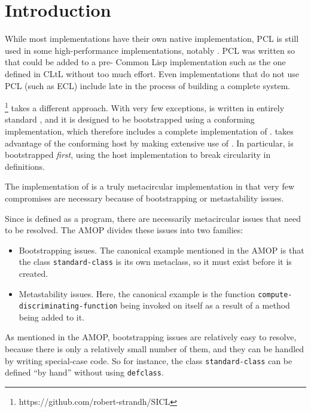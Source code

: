 \section{Introduction}

While most \cl{} implementations have their own native \clos{}
implementation, PCL \cite{Bobrow:1986:CML:28697.28700} is still used
in some high-performance implementations, notably \sbcl{}.  PCL was
written so that \clos{} could be added to a pre-\clos{} Common Lisp
implementation such as the one defined in CLtL \cite{Steele:1984:CLL}
without too much effort.  Even \cl{} implementations that do not use
PCL (such as ECL) include \clos{} late in the process of building a
complete system.

\sicl{}\footnote{https://github.com/robert-strandh/SICL} takes a
different approach.  With very few exceptions, \sicl{} is written in
entirely standard \cl{}, and it is designed to be bootstrapped using a
conforming \cl{} implementation, which therefore includes a complete
implementation of \clos{}.  \sicl{} takes advantage of the conforming
host by making extensive use of \clos{}.  In particular, \clos{} is
bootstrapped \emph{first}, using the host \clos{} implementation to
break circularity in definitions. 

The \sicl{} implementation of \clos{} is a truly metacircular
implementation in that very few compromises are necessary because of
bootstrapping or metastability issues.

Since \clos{} is defined as a \clos{} program, there are necessarily
metacircular issues that need to be resolved.  The AMOP
\cite{Kiczales:1991:AMP:574212} divides these issues into two
families:

\begin{itemize}
\item Bootstrapping issues.  The canonical example mentioned in the
  AMOP is that the class \texttt{standard-class} is its own metaclass,
  so it must exist before it is created.  
\item Metastability issues.  Here, the canonical example is the
  function \texttt{compute-discriminating-function} being invoked on
  itself as a result of a method being added to it.
\end{itemize}

As mentioned in the AMOP, bootstrapping issues are relatively easy to
resolve, because there is only a relatively small number of them, and
they can be handled by writing special-case code.  So for instance,
the class \texttt{standard-class} can be defined ``by hand'' without
using \texttt{defclass}. 

